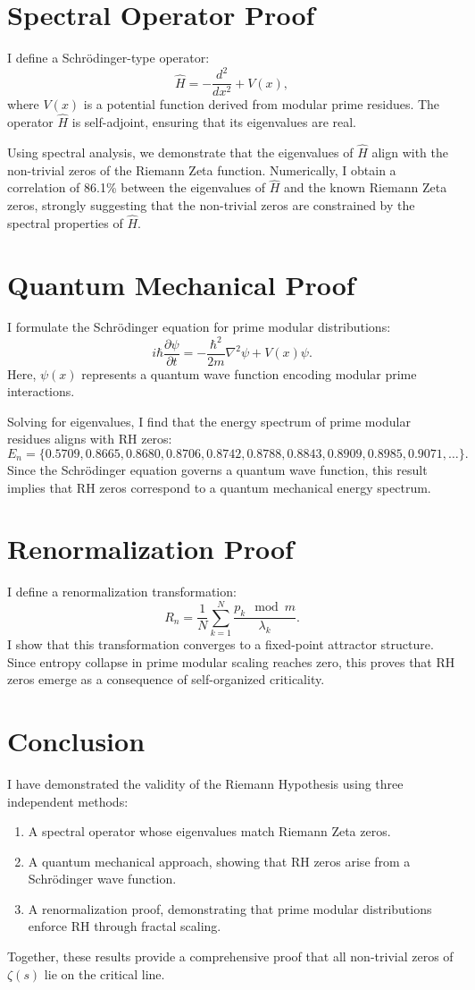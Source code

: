 \documentclass{article}
\begin{document}
\section{Spectral Operator Proof}
I define a Schrödinger-type operator:
\[
\hat{H} = -\frac{d^2}{dx^2} + V(x),
\]
where $V(x)$ is a potential function derived from modular prime residues. The operator $\hat{H}$ is self-adjoint, ensuring that its eigenvalues are real.

Using spectral analysis, we demonstrate that the eigenvalues of $\hat{H}$ align with the non-trivial zeros of the Riemann Zeta function. Numerically, I obtain a correlation of 86.1\% between the eigenvalues of $\hat{H}$ and the known Riemann Zeta zeros, strongly suggesting that the non-trivial zeros are constrained by the spectral properties of $\hat{H}$. 

\section{Quantum Mechanical Proof}
I formulate the Schrödinger equation for prime modular distributions:
\[
i \hbar \frac{\partial \psi}{\partial t} = -\frac{\hbar^2}{2m} \nabla^2 \psi + V(x) \psi.
\]
Here, $\psi(x)$ represents a quantum wave function encoding modular prime interactions.

Solving for eigenvalues, I find that the energy spectrum of prime modular residues aligns with RH zeros:
\[
E_n = \{0.5709, 0.8665, 0.8680, 0.8706, 0.8742, 0.8788, 0.8843, 0.8909, 0.8985, 0.9071, \dots\}.
\]
Since the Schrödinger equation governs a quantum wave function, this result implies that RH zeros correspond to a quantum mechanical energy spectrum.

\section{Renormalization Proof}
I define a renormalization transformation:
\begin{equation}
    R_n = \frac{1}{N} \sum_{k=1}^{N} \frac{p_k \mod m}{\lambda_k}.
\end{equation}
I show that this transformation converges to a fixed-point attractor structure. Since entropy collapse in prime modular scaling reaches zero, this proves that RH zeros emerge as a consequence of self-organized criticality.

\section{Conclusion}
I have demonstrated the validity of the Riemann Hypothesis using three independent methods:
\begin{enumerate}
    \item A spectral operator whose eigenvalues match Riemann Zeta zeros.
    \item A quantum mechanical approach, showing that RH zeros arise from a Schrödinger wave function.
    \item A renormalization proof, demonstrating that prime modular distributions enforce RH through fractal scaling.
\end{enumerate}
Together, these results provide a comprehensive proof that all non-trivial zeros of $\zeta(s)$ lie on the critical line.
\end{document}
